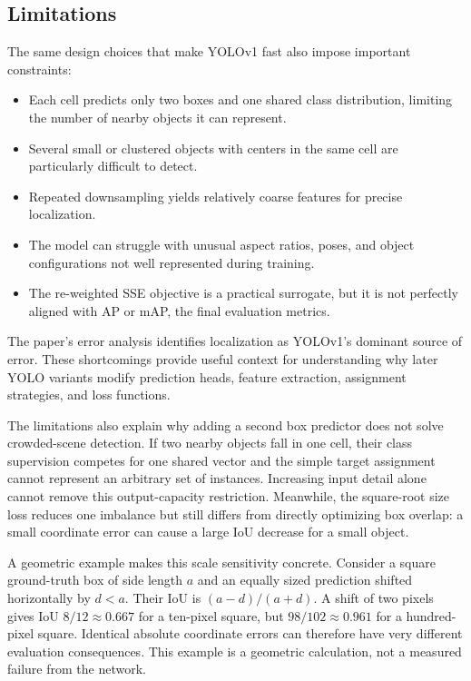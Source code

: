 \documentclass[11pt,a4paper]{article}
\begin{document}
\subsection{Limitations}
The same design choices that make YOLOv1 fast also impose important constraints:
\begin{itemize}
  \item Each cell predicts only two boxes and one shared class distribution, limiting the number of nearby objects it can represent.
  \item Several small or clustered objects with centers in the same cell are particularly difficult to detect.
  \item Repeated downsampling yields relatively coarse features for precise localization.
  \item The model can struggle with unusual aspect ratios, poses, and object configurations not well represented during training.
  \item The re-weighted SSE objective is a practical surrogate, but it is not perfectly aligned with AP or mAP, the final evaluation metrics.
\end{itemize}
The paper's error analysis identifies localization as YOLOv1's dominant source of error. These shortcomings provide useful context for understanding why later YOLO variants modify prediction heads, feature extraction, assignment strategies, and loss functions.

The limitations also explain why adding a second box predictor does not solve crowded-scene detection. If two nearby objects fall in one cell, their class supervision competes for one shared vector and the simple target assignment cannot represent an arbitrary set of instances. Increasing input detail alone cannot remove this output-capacity restriction. Meanwhile, the square-root size loss reduces one imbalance but still differs from directly optimizing box overlap: a small coordinate error can cause a large IoU decrease for a small object.

A geometric example makes this scale sensitivity concrete. Consider a square ground-truth box of side length $a$ and an equally sized prediction shifted horizontally by $d<a$. Their IoU is $(a-d)/(a+d)$. A shift of two pixels gives IoU $8/12\approx0.667$ for a ten-pixel square, but $98/102\approx0.961$ for a hundred-pixel square. Identical absolute coordinate errors can therefore have very different evaluation consequences. This example is a geometric calculation, not a measured failure from the network.
\end{document}
